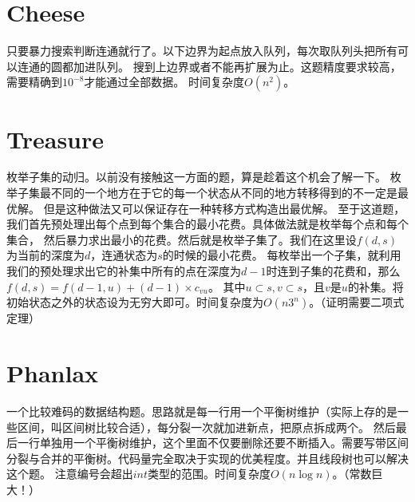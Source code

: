 \documentclass{article}
\begin{document}
\section{Cheese}
只要暴力搜索判断连通就行了。以下边界为起点放入队列，每次取队列头把所有可以连通的圆都加进队列。
搜到上边界或者不能再扩展为止。这题精度要求较高，需要精确到$10^{-8}$才能通过全部数据。
时间复杂度$O(n^2)$。

\section{Treasure}
枚举子集的动归。以前没有接触这一方面的题，算是趁着这个机会了解一下。
枚举子集最不同的一个地方在于它的每一个状态从不同的地方转移得到的不一定是最优解。
但是这种做法又可以保证存在一种转移方式构造出最优解。
至于这道题，我们首先预处理出每个点到每个集合的最小花费。具体做法就是枚举每个点和每个集合，
然后暴力求出最小的花费。然后就是枚举子集了。我们在这里设$f(d,s)$为当前的深度为$d$，连通状态为$s$的时候的最小花费。
每枚举出一个子集，就利用我们的预处理求出它的补集中所有的点在深度为$d-1$时连到子集的花费和，那么$f(d,s)=f(d-1,u)+(d-1)\times c_{vu}$。
其中$u\subset s, v\subset s$，且$v$是$u$的补集。将初始状态之外的状态设为无穷大即可。时间复杂度为$O(n3^n)$。（证明需要二项式定理）

\section{Phanlax}
一个比较难码的数据结构题。思路就是每一行用一个平衡树维护（实际上存的是一些区间，叫区间树比较合适），每分裂一次就加进新点，把原点拆成两个。
然后最后一行单独用一个平衡树维护，这个里面不仅要删除还要不断插入。需要写带区间分裂与合并的平衡树。代码量完全取决于实现的优美程度。并且线段树也可以解决这个题。
注意编号会超出$int$类型的范围。时间复杂度$O(n \log n)$。（常数巨大！）
\end{document}
